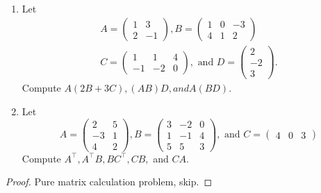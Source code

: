 \begin{exercise} \label{exercise 2.3.2} \ 

\begin{enumerate}
\item Let
\[
    \begin{array}{l}
        A=\left(\begin{array}{rr}
            1 & 3 \\
            2 & -1
        \end{array}\right),
        B=\left(\begin{array}{rrr}
            1 & 0 & -3 \\
            4 & 1 & 2
        \end{array}\right) \\
        C=\left(\begin{array}{rrr}
            1 & 1 & 4 \\
            -1 & -2 & 0
        \end{array}\right),
        \text { and }
        D=\left(\begin{array}{r}
            2 \\
            -2 \\
            3
        \end{array}\right).
    \end{array}
\]
Compute  \(A(2B + 3C), (AB)D, and A(BD)\).

\item Let
\[
    A=\left(\begin{array}{rr}
        2 & 5 \\
        -3 & 1 \\
        4 & 2
    \end{array}\right),
    B=\left(\begin{array}{rrr}
        3 & -2 & 0 \\
        1 & -1 & 4 \\
        5 & 5 & 3
    \end{array}\right),
    \text { and }
    C=\left(\begin{array}{lll}
        4 & 0 & 3
    \end{array}\right)
\]
Compute \(A^\top, A^\top B, B C^\top, CB,\) and \(CA\).
\end{enumerate}
\end{exercise}

\begin{proof}
Pure matrix calculation problem, skip.
\end{proof}

